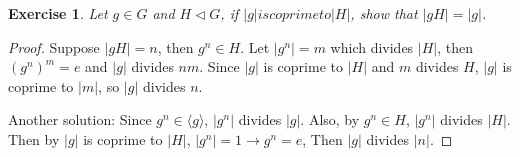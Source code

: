 \documentclass[14pt]{extarticle}
\newtheorem{exercise}{Exercise}[section]
\newcommand{\normalin}{\triangleleft}
\newcommand{\1}{\{ e \}}
\begin{document}
\setcounter{exercise}{80}
\begin{exercise}
  Let $g \in G$ and $H \normalin G$, if $|g| is coprime to |H|$, show that $|gH| = |g|$.
\end{exercise}
\begin{proof}
  Suppose $|gH| = n$, then $g^n \in H$.
  Let $|g^n| = m$ which divides $|H|$,
  then $(g^n)^m = e$ and $|g|$ divides $nm$.
  Since $|g|$ is coprime to $|H|$ and $m$ divides $H$,
  $|g|$ is coprime to $|m|$, so $|g|$ divides $n$.

  Another solution: Since $g^n \in \langle g \rangle$, $|g^n|$ divides $|g|$.
  Also, by $g^n \in H$, $|g^n|$ divides $|H|$. Then by $|g|$ is coprime to $|H|$,
  $|g^n| = 1 \rightarrow g^n = e$, Then $|g|$ divides $|n|$.
\end{proof}
\end{document}
